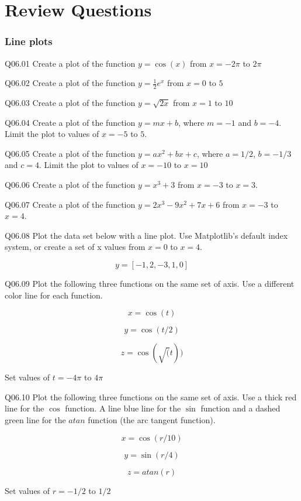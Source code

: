 \documentclass{book}
\newenvironment{problems}{}{}  %
\begin{document}
    
        \section{Review Questions}\label{review-questions}
    




    
        \subsubsection{Line plots}\label{line-plots}
    




    
        \begin{problems}
        Q06.01 Create a plot of the function \(y=\cos(x)\) from \(x = -2\pi\) to
\(2\pi\)

Q06.02 Create a plot of the function \(y=\frac{1}{2}{e^x}\) from
\(x = 0\) to \(5\)

Q06.03 Create a plot of the function \(y=\sqrt{2x}\) from \(x = 1\) to
\(10\)

Q06.04 Create a plot of the function \(y=mx+b\), where \(m=-1\) and
\(b=-4\). Limit the plot to values of \(x=-5\) to \(5\).

Q06.05 Create a plot of the function \(y=ax^2+bx+c\), where \(a=1/2\),
\(b=-1/3\) and \(c=4\). Limit the plot to values of \(x=-10\) to
\(x=10\)

Q06.06 Create a plot of the function \(y=x^3+3\) from \(x=-3\) to
\(x=3\).

Q06.07 Create a plot of the function \(y=2x^3-9x^2+7x+6\) from \(x=-3\)
to \(x=4\).

Q06.08 Plot the data set below with a line plot. Use Matplotlib's
default index system, or create a set of x values from \(x=0\) to
\(x = 4\).

\[ y = [-1, 2, -3, 1, 0] \]

Q06.09 Plot the following three functions on the same set of axis. Use a
different color line for each function.

\[ x = \cos(t) \]

\[ y = \cos(t/2) \]

\[ z = \cos(\sqrt(t)) \]

Set values of \(t=-4\pi\) to \(4\pi\)

Q06.10 Plot the following three functions on the same set of axis. Use a
thick red line for the \(\cos\) function. A line blue line for the
\(\sin\) function and a dashed green line for the \(atan\) function (the
arc tangent function).

\[ x = \cos(r/10) \]

\[ y = \sin(r/4) \]

\[ z = atan(r) \]

Set values of \(r=-1/2\) to \(1/2\)
        \end{problems}
\end{document}
